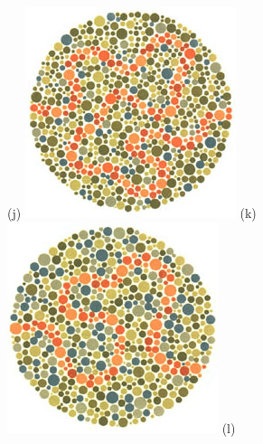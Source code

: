 \documentclass[	12pt, Times, openright, twoside, a4paper, english, brazil]{abntex2}
\begin{document}
\begin{apendicesenv}
\begin{figure}[!htb]
(j)
\endminipage\hfill
{}
\centering
{\includegraphics[width=\linewidth]{ishihara-fuga/plate32.jpg}}
(k)
\endminipage\hfill
{}
\centering
{\includegraphics[width=\linewidth]{ishihara-fuga/plate33.jpg}}
(l)


\end{figure}
\end{apendicesenv}
\end{document}
